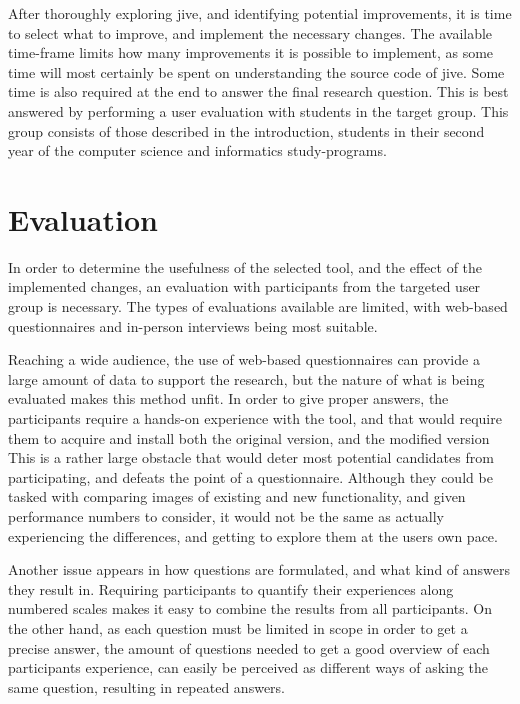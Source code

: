 After thoroughly exploring \gls{jive}, and identifying potential improvements, it is time to select what to improve, and implement the necessary changes.
The available time-frame limits how many improvements it is possible to implement, as some time will most certainly be spent on understanding the source code of \gls{jive}.
Some time is also required at the end to answer the final research question.
This is best answered by performing a user evaluation with students in the target group.
This group consists of those described in the introduction, students in their second year of the computer science and informatics study-programs.

\section{Evaluation}\label{methEval}

In order to determine the usefulness of the selected tool, and the effect of the implemented changes, an evaluation with participants from the targeted user group is necessary.
The types of evaluations available are limited, with web-based questionnaires and in-person interviews being most suitable.

Reaching a wide audience, the use of web-based questionnaires can provide a large amount of data to support the research, but the nature of what is being evaluated makes this method unfit.
In order to give proper answers, the participants require a hands-on experience with the tool, and that would require them to acquire and install both the original version, and the modified version
This is a rather large obstacle that would deter most potential candidates from participating, and defeats the point of a questionnaire.
Although they could be tasked with comparing images of existing and new functionality, and given performance numbers to consider, it would not be the same as actually experiencing the differences, and getting to explore them at the users own pace.

Another issue appears in how questions are formulated, and what kind of answers they result in.
Requiring participants to quantify their experiences along numbered scales makes it easy to combine the results from all participants.
On the other hand, as each question must be limited in scope in order to get a precise answer, the amount of questions needed to get a good overview of each participants experience, can easily be perceived as different ways of asking the same question, resulting in repeated answers.

